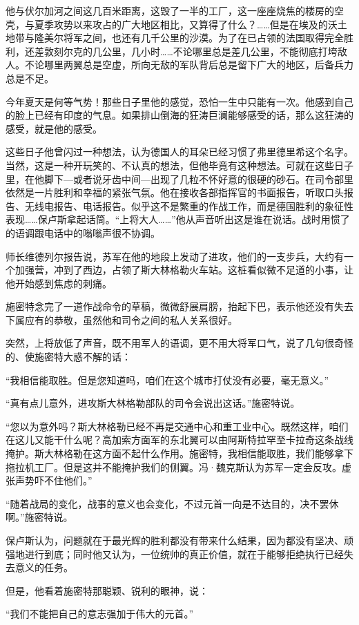 他与伏尔加河之间这几百米距离，这毁了一半的工厂，这一座座烧焦的楼房的空壳，与夏季攻势以来攻占的广大地区相比，又算得了什么？……但是在埃及的沃土地带与隆美尔将军之间，也还有几千公里的沙漠。为了在已占领的法国取得完全胜利，还差敦刻尔克的几公里，几小时……不论哪里总是差几公里，不能彻底打垮敌人。不论哪里两翼总是空虚，所向无敌的军队背后总是留下广大的地区，后备兵力总是不足。

今年夏天是何等气势！那些日子里他的感觉，恐怕一生中只能有一次。他感到自己的脸上已经有印度的气息。如果排山倒海的狂涛巨澜能够感受的话，那么这狂涛的感受，就是他的感受。

这些日子他曾闪过一种想法，认为德国人的耳朵已经习惯了弗里德里希这个名字。当然，这是一种开玩笑的、不认真的想法，但他毕竟有这种想法。可就在这些日子里，在他脚下—或者说牙齿中间—出现了几粒不怀好意的很硬的砂石。在司令部里依然是一片胜利和幸福的紧张气氛。他在接收各部指挥官的书面报告，听取口头报告、无线电报告、电话报告。似乎这不是繁重的作战工作，而是德国胜利的象征性表现……保卢斯拿起话筒。“上将大人……”他从声音听出这是谁在说话。战时用惯了的语调跟电话中的嗡嗡声很不协调。

师长维德列尔报告说，苏军在他的地段上发动了进攻，他们的一支步兵，大约有一个加强营，冲到了西边，占领了斯大林格勒火车站。这桩看似微不足道的小事，让他开始感到焦虑的刺痛。

施密特念完了一道作战命令的草稿，微微舒展肩膀，抬起下巴，表示他还没有失去下属应有的恭敬，虽然他和司令之间的私人关系很好。

突然，上将放低了声音，既不用军人的语调，更不用大将军口气，说了几句很奇怪的、使施密特大惑不解的话：

“我相信能取胜。但是您知道吗，咱们在这个城市打仗没有必要，毫无意义。”

“真有点儿意外，进攻斯大林格勒部队的司令会说出这话。”施密特说。

“您以为意外吗？斯大林格勒已经不再是交通中心和重工业中心。既然这样，咱们在这儿又能干什么呢？高加索方面军的东北翼可以由阿斯特拉罕至卡拉奇这条战线掩护。斯大林格勒在这方面不起什么作用。施密特，我相信能取胜，我们能够拿下拖拉机工厂。但是这并不能掩护我们的侧翼。冯·魏克斯认为苏军一定会反攻。虚张声势吓不住他们。”

“随着战局的变化，战事的意义也会变化，不过元首一向是不达目的，决不罢休啊。”施密特说。

保卢斯认为，问题就在于最光辉的胜利都没有带来什么结果，因为都没有坚决、顽强地进行到底；同时他又认为，一位统帅的真正价值，就在于能够拒绝执行已经失去意义的任务。

但是，他看着施密特那聪颖、锐利的眼神，说：

“我们不能把自己的意志强加于伟大的元首。”

